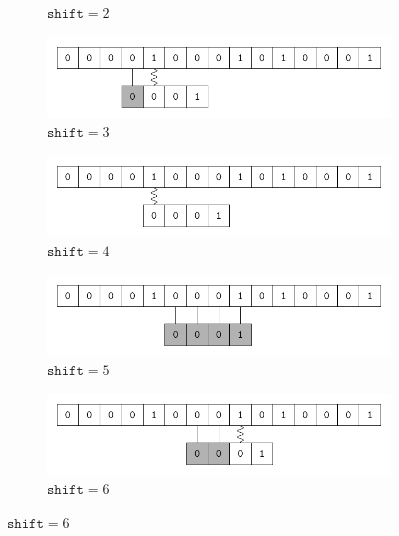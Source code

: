 \begin{description}
\begin{ex}
\begin{figure}[H]
\begin{subfigure}[t]{.45\textwidth}
        \caption{$\texttt{shift} = 2$}\label{fig:32_1-1_3}
      \end{subfigure}
      \begin{subfigure}[t]{.45\textwidth}
        \centering
        \includegraphics[scale=.6]{img/32_1-1/32_1-1_4.pdf}
        \caption{$\texttt{shift} = 3$}\label{fig:32_1-1_4}
      \end{subfigure}
      \begin{subfigure}[t]{.45\textwidth}
        \centering
        \includegraphics[scale=.6]{img/32_1-1/32_1-1_5.pdf}
        \caption{$\texttt{shift} = 4$}\label{fig:32_1-1_5}
      \end{subfigure}
      \begin{subfigure}[t]{.45\textwidth}
        \centering
        \includegraphics[scale=.6]{img/32_1-1/32_1-1_6.pdf}
        \caption{$\texttt{shift} = 5$}\label{fig:32_1-1_6}
      \end{subfigure}
      \begin{subfigure}[t]{.45\textwidth}
        \centering
        \includegraphics[scale=.6]{img/32_1-1/32_1-1_7.pdf}
        \caption{$\texttt{shift} = 6$}\label{fig:32_1-1_7}
      \end{subfigure}

\end{figure}
\end{ex}
\end{description}
